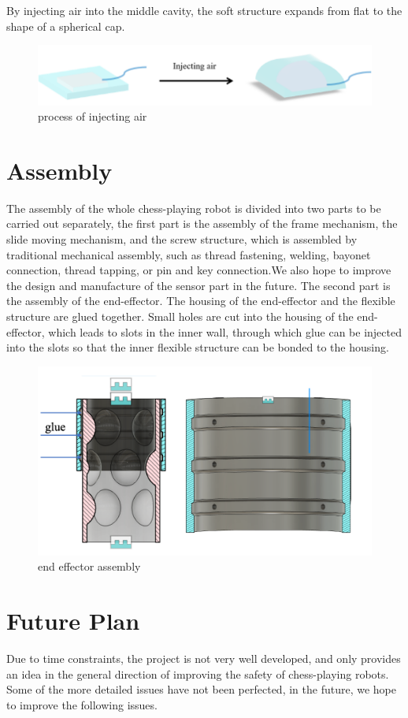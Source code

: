 \documentclass[10pt, a4paper, twocolumn]{article}
\begin{document}
By injecting air into the middle cavity, the soft structure expands from flat to the shape of a spherical cap.

\begin{figure}
    \centering
    \includegraphics[width=0.8\linewidth]{process of injecting air.png}
    \caption{process of injecting air}
    \label{fig:process of injecting air}
\end{figure}

\section{Assembly}
The assembly of the whole chess-playing robot is divided into two parts to be carried out separately, the first part is the assembly of the frame mechanism, the slide moving mechanism, and the screw structure, which is assembled by traditional mechanical assembly, such as thread fastening, welding, bayonet connection, thread tapping, or pin and key connection.We also hope to improve the design and manufacture of the sensor part in the future.
The second part is the assembly of the end-effector. The housing of the end-effector and the flexible structure are glued together. Small holes are cut into the housing of the end-effector, which leads to slots in the inner wall, through which glue can be injected into the slots so that the inner flexible structure can be bonded to the housing.
\begin{figure}
    \centering
    \includegraphics[width=0.8\linewidth]{end effector assembly.png}
    \caption{end effector assembly}
    \label{fig:end effector assembly}
\end{figure}

\section{Future Plan}
Due to time constraints, the project is not very well developed, and only provides an idea in the general direction of improving the safety of chess-playing robots. Some of the more detailed issues have not been perfected, in the future, we hope to improve the following issues.
\end{document}
